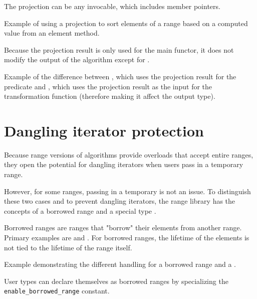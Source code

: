 The projection can be any invocable, which includes member pointers.

\begin{box-note}
\footnotesize Example of using a projection to sort elements of a range based on a computed value from an element method.
\tcblower
{}
\end{box-note}

Because the projection result is only used for the main functor, it does not modify the output of the algorithm except for .

\begin{box-note}
\footnotesize Example of the difference between , which uses the projection result for the predicate and , which uses the projection result as the input for the transformation function (therefore making it affect the output type).
\tcblower
{}
\end{box-note}

\section{Dangling iterator protection}

Because range versions of algorithms provide overloads that accept entire ranges, they open the potential for dangling iterators when users pass in a temporary range.

However, for some ranges, passing in a temporary is not an issue. To distinguish these two cases and to prevent dangling iterators, the range library has the concepts of a borrowed range and a special type .

Borrowed ranges are ranges that "borrow" their elements from another range. Primary examples are  and . For borrowed ranges, the lifetime of the elements is not tied to the lifetime of the range itself.

\begin{box-note}
\footnotesize Example demonstrating the different handling for a borrowed range  and a .
\tcblower
{}
\end{box-note}

User types can declare themselves as borrowed ranges by specializing the \texttt{enable\-\_borrowed\-\_range} constant.

